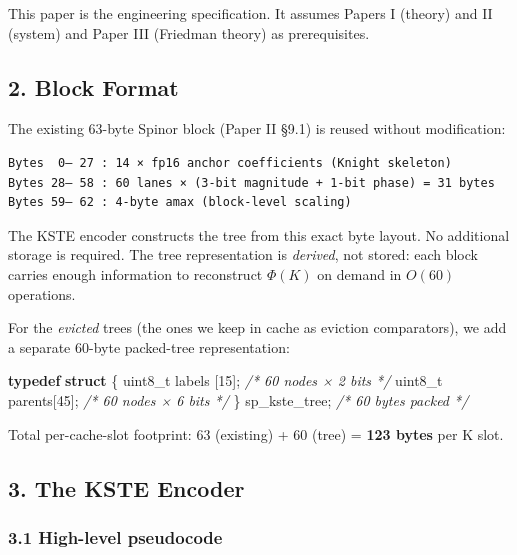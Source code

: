 \documentclass[
  11pt,
]{article}
\newenvironment{Shaded}{}{}
\newcommand{\CommentTok}[1]{\textcolor[rgb]{0.38,0.63,0.69}{\textit{#1}}}
\newcommand{\DataTypeTok}[1]{\textcolor[rgb]{0.56,0.13,0.00}{#1}}
\newcommand{\DecValTok}[1]{\textcolor[rgb]{0.25,0.63,0.44}{#1}}
\newcommand{\KeywordTok}[1]{\textcolor[rgb]{0.00,0.44,0.13}{\textbf{#1}}}
\newcommand{\NormalTok}[1]{#1}
\begin{document}
This paper is the engineering specification. It assumes Papers I
(theory) and II (system) and Paper III (Friedman theory) as
prerequisites.

\hypertarget{block-format}{%
\subsection{2. Block Format}\label{block-format}}

The existing 63-byte Spinor block (Paper II §9.1) is reused without
modification:

\begin{verbatim}
Bytes  0– 27 : 14 × fp16 anchor coefficients (Knight skeleton)
Bytes 28– 58 : 60 lanes × (3-bit magnitude + 1-bit phase) = 31 bytes
Bytes 59– 62 : 4-byte amax (block-level scaling)
\end{verbatim}

The KSTE encoder constructs the tree from this exact byte layout. No
additional storage is required. The tree representation is
\emph{derived}, not stored: each block carries enough information to
reconstruct \(\Phi(K)\) on demand in \(O(60)\) operations.

For the \emph{evicted} trees (the ones we keep in cache as eviction
comparators), we add a separate 60-byte packed-tree representation:

\begin{Shaded}
\begin{Highlighting}[]
\KeywordTok{typedef} \KeywordTok{struct}\NormalTok{ \{}
    \DataTypeTok{uint8\_t}\NormalTok{ labels [}\DecValTok{15}\NormalTok{];   }\CommentTok{/* 60 nodes × 2 bits */}
    \DataTypeTok{uint8\_t}\NormalTok{ parents[}\DecValTok{45}\NormalTok{];   }\CommentTok{/* 60 nodes × 6 bits */}
\NormalTok{\} sp\_kste\_tree;            }\CommentTok{/* 60 bytes packed */}
\end{Highlighting}
\end{Shaded}

Total per-cache-slot footprint: 63 (existing) + 60 (tree) = \textbf{123
bytes} per K slot.

\hypertarget{the-kste-encoder}{%
\subsection{3. The KSTE Encoder}\label{the-kste-encoder}}

\hypertarget{high-level-pseudocode}{%
\subsubsection{3.1 High-level pseudocode}\label{high-level-pseudocode}}
\end{document}
